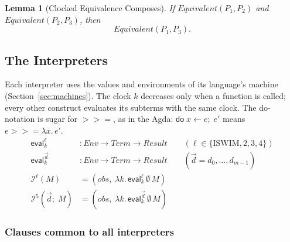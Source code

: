 \documentclass[10pt]{article}
\theoremstyle{acmplain}
\newtheorem{lemma}[theorem]{Lemma}
\newcommand{\key}[1]{\mathsf{#1}}
\newcommand{\obs}{\mathit{obs}}
\newcommand{\Equiv}{\mathit{Equivalent}}
\newcommand{\bind}{\mathbin{>\!\!>\!\!=}}
\newcommand{\Do}{\key{do}\;}
\newcommand{\EV}[2]{\key{eval}^{#1}_{#2}}
\newcommand{\Interp}[1]{\mathcal{I}^{#1}}
\begin{document}
\begin{lemma}[Clocked Equivalence Composes]\label{lem:equiv-trans-clk}
If $\Equiv(P_1, P_2)$ and $\Equiv(P_2, P_3)$, then
\[
  \Equiv(P_1, P_3) .
\]
\end{lemma}

\subsection{The Interpreters}

Each interpreter uses the values and environments of its language's machine
(Section~\ref{sec:machines}). The clock $k$ decreases only when a function is
called; every other construct evaluates its subterms with the same clock.
The do-notation is sugar for $\bind$, as in the Agda:
$\Do x \leftarrow e;\; e'$ means $e \bind \lambda x.\, e'$.
\begin{align*}
  \EV{\ell}{k} &: \mathit{Env} \to \mathit{Term} \to \mathit{Result}
    \qquad (\ell \in \{\mathrm{ISWIM}, 2, 3, 4\}) \\
  \EV{\vec{d}}{k} &: \mathit{Env} \to \mathit{Term} \to \mathit{Result}
    \qquad (\vec{d} = d_0, \ldots, d_{m-1}) \\[1ex]
  \Interp{\ell}(M) &= (\obs,\; \lambda k.\, \EV{\ell}{k}\,\emptyset\,M) \\
  \Interp{5}(\vec{d};\; M) &= (\obs,\; \lambda k.\, \EV{\vec{d}}{k}\,\emptyset\,M)
\end{align*}

\subsubsection{Clauses common to all interpreters}
\end{document}
